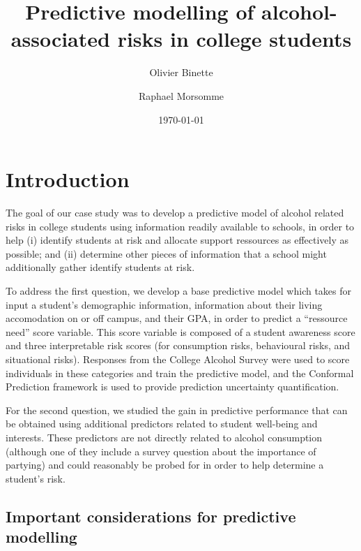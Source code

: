 \documentclass[10pt]{jmlr}%
\title[Predictive modelling of alcohol-associated risks in college students]{Predictive modelling of alcohol-associated risks in college students}
\author[Binette, Morsomme]{Olivier Binette \and Raphael Morsomme}
\date{\today} %
\begin{document}
\maketitle

\begin{abstract}

\end{abstract}

\section{Introduction}
\label{sec:intro}



The goal of our case study was to develop a predictive model of alcohol related risks in college students using information readily available to schools, in order to help (i) identify students at risk and allocate support ressources as effectively as possible; and (ii) determine other pieces of information that a school might additionally gather identify students at risk.

To address the first question, we develop a base predictive model which takes for input a student's demographic information, information about their living accomodation on or off campus, and their GPA, in order to predict a ``ressource need'' score variable. This score variable is composed of a student awareness score and three interpretable risk scores (for consumption risks, behavioural risks, and situational risks). Responses from the College Alcohol Survey were used to score individuals in these categories and train the predictive model, and the Conformal Prediction framework is used to provide prediction uncertainty quantification.

For the second question, we studied the gain in predictive performance that can be obtained using additional predictors related to student well-being and interests. These predictors are not directly related to alcohol consumption (although one of they include a survey question about the importance of partying) and could reasonably be probed for in order to help determine a student's risk. 

\subsection{Important considerations for predictive modelling}
\end{document}
